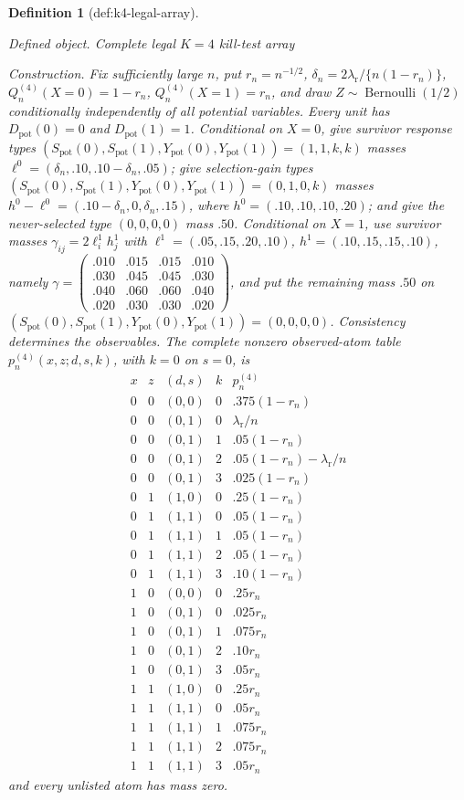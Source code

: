 \documentclass{article}
\newtheorem{definition}{Definition}
\begin{document}
\begin{definition}[def:k4-legal-array]\label{def:k4-legal-array}
\par\smallskip\noindent\emph{Defined object.} Complete legal \(K=4\) kill-test array
\par\smallskip\noindent\emph{Construction.} Fix sufficiently large \(n\), put \(r_n=n^{-1/2}\), \(\delta_n=2\lambda_{\mathrm r}/\{n(1-r_n)\}\), \(Q_n^{(4)}(X=0)=1-r_n\), \(Q_n^{(4)}(X=1)=r_n\), and draw \(Z\sim\operatorname{Bernoulli}(1/2)\) conditionally independently of all potential variables. Every unit has \(D_{\mathrm{pot}}(0)=0\) and \(D_{\mathrm{pot}}(1)=1\). Conditional on \(X=0\), give survivor response types \((S_{\mathrm{pot}}(0),S_{\mathrm{pot}}(1),Y_{\mathrm{pot}}(0),Y_{\mathrm{pot}}(1))=(1,1,k,k)\) masses \(\ell^0=(\delta_n,.10,.10-\delta_n,.05)\); give selection-gain types \((S_{\mathrm{pot}}(0),S_{\mathrm{pot}}(1),Y_{\mathrm{pot}}(0),Y_{\mathrm{pot}}(1))=(0,1,0,k)\) masses \(h^0-\ell^0=(.10-\delta_n,0,\delta_n,.15)\), where \(h^0=(.10,.10,.10,.20)\); and give the never-selected type \((0,0,0,0)\) mass \(.50\). Conditional on \(X=1\), use survivor masses \(\gamma_{ij}=2\ell_i^1h_j^1\) with \(\ell^1=(.05,.15,.20,.10)\), \(h^1=(.10,.15,.15,.10)\), namely \(\gamma=\begin{pmatrix}.010&.015&.015&.010\\.030&.045&.045&.030\\.040&.060&.060&.040\\.020&.030&.030&.020\end{pmatrix}\), and put the remaining mass \(.50\) on \((S_{\mathrm{pot}}(0),S_{\mathrm{pot}}(1),Y_{\mathrm{pot}}(0),Y_{\mathrm{pot}}(1))=(0,0,0,0)\). Consistency determines the observables. The complete nonzero observed-atom table \(p_n^{(4)}(x,z;d,s,k)\), with \(k=0\) on \(s=0\), is \[\begin{array}{c|c|c|c|c}x&z&(d,s)&k&p_n^{(4)}\\\hline 0&0&(0,0)&0&.375(1-r_n)\\0&0&(0,1)&0&\lambda_{\mathrm r}/n\\0&0&(0,1)&1&.05(1-r_n)\\0&0&(0,1)&2&.05(1-r_n)-\lambda_{\mathrm r}/n\\0&0&(0,1)&3&.025(1-r_n)\\0&1&(1,0)&0&.25(1-r_n)\\0&1&(1,1)&0&.05(1-r_n)\\0&1&(1,1)&1&.05(1-r_n)\\0&1&(1,1)&2&.05(1-r_n)\\0&1&(1,1)&3&.10(1-r_n)\\1&0&(0,0)&0&.25r_n\\1&0&(0,1)&0&.025r_n\\1&0&(0,1)&1&.075r_n\\1&0&(0,1)&2&.10r_n\\1&0&(0,1)&3&.05r_n\\1&1&(1,0)&0&.25r_n\\1&1&(1,1)&0&.05r_n\\1&1&(1,1)&1&.075r_n\\1&1&(1,1)&2&.075r_n\\1&1&(1,1)&3&.05r_n\end{array}\] and every unlisted atom has mass zero.

\end{definition}
\end{document}
